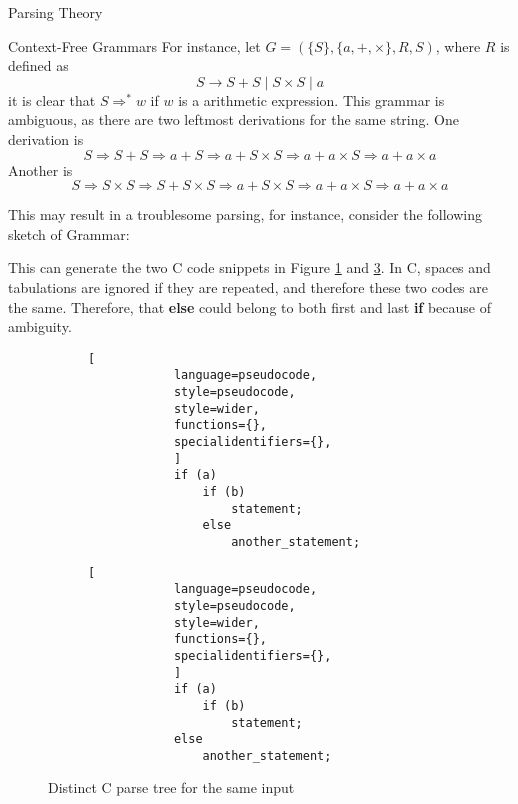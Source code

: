 \begin{section}{Parsing Theory}
\begin{subsection}{Context-Free Grammars}
For instance, let $G = (\{S\}, \{a, +, \times\}, R, S)$, where $R$ is defined
as
$$S \rightarrow S+S \; | \; S \times S \; | \; a $$
it is clear that $S \Rightarrow^* w$ if $w$ is a arithmetic expression. This
grammar is ambiguous, as there are two leftmost derivations for the same string.
One derivation is
$$ S \Rightarrow S + S \Rightarrow a + S \Rightarrow a + S \times S \Rightarrow a + a \times S \Rightarrow a + a \times a$$
Another is
$$ S \Rightarrow S \times S \Rightarrow S + S \times S \Rightarrow a + S \times S \Rightarrow a + a \times S \Rightarrow a + a \times a$$

This may result in a troublesome parsing, for instance, consider the
following sketch of Grammar:



This can generate the two C code snippets in Figure \ref{fig:left_if} and
\ref{fig:right_if}. In C, spaces and tabulations are ignored if they are
repeated, and therefore these two codes are the same. Therefore, that
\textbf{else} could belong to both first and last \textbf{if} because of
ambiguity. 

\begin{figure}[ht]
    \centering
    \begin{subfigure}[b]{0.40\textwidth}

		\begin{lstlisting}[
			language=pseudocode,
			style=pseudocode,
			style=wider,
			functions={},
			specialidentifiers={},
			]
			if (a)
				if (b)
					statement;
				else
					another_statement;
		\end{lstlisting}
        \caption{\label{fig:left_if}}

    \end{subfigure}
    \begin{subfigure}[b]{0.40\textwidth}
		\begin{lstlisting}[
			language=pseudocode,
			style=pseudocode,
			style=wider,
			functions={},
			specialidentifiers={},
			]
			if (a)
				if (b)
					statement;
			else
				another_statement;
		\end{lstlisting}
        \caption{\label{fig:right_if}}
\end{subfigure}
\caption{Distinct C parse tree for the same input}
\end{figure}


\end{subsection}
\end{section}
